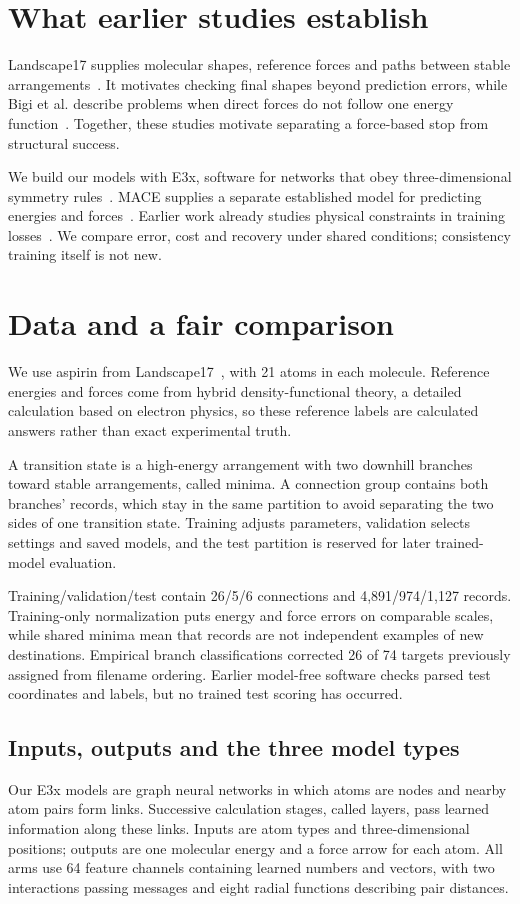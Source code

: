 \documentclass{article}
\begin{document}
\section{What earlier studies establish}
Landscape17 supplies molecular shapes, reference forces and paths between stable arrangements~\cite{landscape}. It motivates checking final shapes beyond prediction errors, while Bigi et al. describe problems when direct forces do not follow one energy function~\cite{bigi}. Together, these studies motivate separating a force-based stop from structural success.

We build our models with E3x, software for networks that obey three-dimensional symmetry rules~\cite{e3x}. MACE supplies a separate established model for predicting energies and forces~\cite{mace}. Earlier work already studies physical constraints in training losses~\cite{takamoto}. We compare error, cost and recovery under shared conditions; consistency training itself is not new.

\section{Data and a fair comparison}
We use aspirin from Landscape17~\cite{landscape}, with 21 atoms in each molecule. Reference energies and forces come from hybrid density-functional theory, a detailed calculation based on electron physics, so these reference labels are calculated answers rather than exact experimental truth.

A transition state is a high-energy arrangement with two downhill branches toward stable arrangements, called minima. A connection group contains both branches' records, which stay in the same partition to avoid separating the two sides of one transition state. Training adjusts parameters, validation selects settings and saved models, and the test partition is reserved for later trained-model evaluation.

Training/validation/test contain 26/5/6 connections and 4,891/974/1,127 records. Training-only normalization puts energy and force errors on comparable scales, while shared minima mean that records are not independent examples of new destinations. Empirical branch classifications corrected 26 of 74 targets previously assigned from filename ordering. Earlier model-free software checks parsed test coordinates and labels, but no trained test scoring has occurred.
\subsection{Inputs, outputs and the three model types}
Our E3x models are graph neural networks in which atoms are nodes and nearby atom pairs form links. Successive calculation stages, called layers, pass learned information along these links. Inputs are atom types and three-dimensional positions; outputs are one molecular energy and a force arrow for each atom. All arms use 64 feature channels containing learned numbers and vectors, with two interactions passing messages and eight radial functions describing pair distances.
\end{document}
